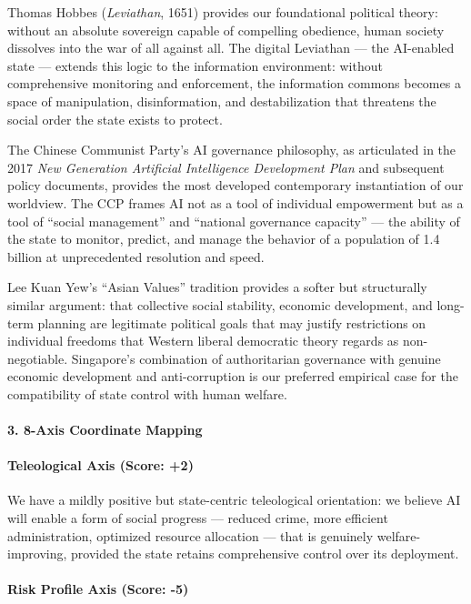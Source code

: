 Thomas Hobbes (\emph{Leviathan}, 1651) provides our foundational
political theory: without an absolute sovereign capable of compelling
obedience, human society dissolves into the war of all against all. The
digital Leviathan --- the AI-enabled state --- extends this logic to the
information environment: without comprehensive monitoring and
enforcement, the information commons becomes a space of manipulation,
disinformation, and destabilization that threatens the social order the
state exists to protect.

The Chinese Communist Party's AI governance philosophy, as articulated
in the 2017 \emph{New Generation Artificial Intelligence Development
Plan} and subsequent policy documents, provides the most developed
contemporary instantiation of our worldview. The CCP frames AI not as a
tool of individual empowerment but as a tool of ``social management''
and ``national governance capacity'' --- the ability of the state to
monitor, predict, and manage the behavior of a population of 1.4 billion
at unprecedented resolution and speed.

Lee Kuan Yew's ``Asian Values'' tradition provides a softer but
structurally similar argument: that collective social stability,
economic development, and long-term planning are legitimate political
goals that may justify restrictions on individual freedoms that Western
liberal democratic theory regards as non-negotiable. Singapore's
combination of authoritarian governance with genuine economic
development and anti-corruption is our preferred empirical case for the
compatibility of state control with human welfare.

\paragraph{3. 8-Axis Coordinate
Mapping}\label{axis-coordinate-mapping-22}

\paragraph{Teleological Axis (Score:
+2)}\label{teleological-axis-score-2-1}

We have a mildly positive but state-centric teleological orientation: we
believe AI will enable a form of social progress --- reduced crime, more
efficient administration, optimized resource allocation --- that is
genuinely welfare-improving, provided the state retains comprehensive
control over its deployment.

\paragraph{Risk Profile Axis (Score:
-5)}\label{risk-profile-axis-score--5-1}

